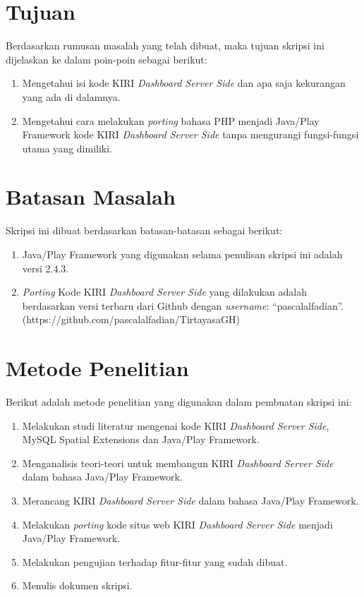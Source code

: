 \section{Tujuan}
\label{sec:tujuan}
Berdasarkan rumusan masalah yang telah dibuat, maka tujuan skripsi ini dijelaskan ke dalam poin-poin sebagai berikut:
	\begin{enumerate}
		\item Mengetahui isi kode KIRI \textit{Dashboard Server Side} dan apa saja kekurangan yang ada di dalamnya.
		\item Mengetahui cara melakukan \textit{porting} bahasa PHP menjadi Java/Play Framework kode KIRI \textit{Dashboard Server Side} tanpa mengurangi fungsi-fungsi utama yang dimiliki.
	\end{enumerate}
	
\section{Batasan Masalah}
\label{sec:batasan_masalah}
Skripsi ini dibuat berdasarkan batasan-batasan sebagai berikut:
	\begin{enumerate}
		\item Java/Play Framework yang digunakan selama penulisan skripsi ini adalah versi 2.4.3.
		\item \textit{Porting} Kode KIRI \textit{Dashboard Server Side} yang dilakukan adalah berdasarkan versi terbaru dari Github dengan \textit{username}: ``pascalalfadian''. (https://github.com/pascalalfadian/TirtayasaGH)
	\end{enumerate}
	
\section{Metode Penelitian}
\label{sec:metode_penelitian}
Berikut adalah metode penelitian yang digunakan dalam pembuatan skripsi ini:
	\begin{enumerate}
		\item Melakukan studi literatur mengenai kode KIRI \textit{Dashboard Server Side}, MySQL Spatial Extensions dan Java/Play Framework.
		\item Menganalisis teori-teori untuk membangun KIRI \textit{Dashboard Server Side} dalam bahasa Java/Play Framework.
		\item Merancang KIRI \textit{Dashboard Server Side} dalam bahasa Java/Play Framework.
		\item Melakukan \textit{porting} kode situs web KIRI \textit{Dashboard Server Side} menjadi Java/Play Framework.
		\item Melakukan pengujian terhadap fitur-fitur yang sudah dibuat.
		\item Menulis dokumen skripsi.
	\end{enumerate}

